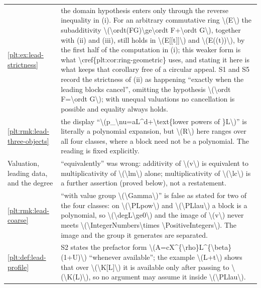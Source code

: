 \documentclass[11pt,oneside]{article}
\theoremstyle{plain}
\theoremstyle{definition}
\theoremstyle{remark}
\begin{document}
\begin{longtable}{@{}p{} p{}@{}}
\cref{plt:ex:lead-strictness} & the domain hypothesis enters only through the reverse inequality in (i). For an arbitrary commutative ring \textbackslash (E\textbackslash ) the subadditivity \textbackslash (\textbackslash ordt(FG)\textbackslash ge\textbackslash ordt F+\textbackslash ordt G\textbackslash ), together with (ii) and (iii), still holds in \textbackslash (E[[t]]\textbackslash ) and \textbackslash (E((t))\textbackslash ), by the first half of the computation in (i); this weaker form is what \textbackslash cref\{plt:cor:ring-geometric\} uses, and stating it here is what keeps that corollary free of a circular appeal. S1 and S5 record the strictness of (ii) as happening ``exactly when the leading blocks cancel'', omitting the hypothesis \textbackslash (\textbackslash ordt F=\textbackslash ordt G\textbackslash ); with unequal valuations no cancellation is possible and equality always holds.\\
\cref{plt:rmk:lead-three-objects} & the display ``\textbackslash (p\_\textbackslash nu=aL\textasciicircum d+\textbackslash text\{lower powers of \}L\textbackslash )'' is literally a polynomial expansion, but \textbackslash (R\textbackslash ) here ranges over all four classes, where a block need not be a polynomial. The reading is fixed explicitly.\\
Valuation, leading data, and the degree  & ``equivalently'' was wrong: additivity of \textbackslash (v\textbackslash ) is equivalent to multiplicativity of \textbackslash (\textbackslash lm\textbackslash ) alone; multiplicativity of \textbackslash (\textbackslash lc\textbackslash ) is a further assertion (proved below), not a restatement.\\
\cref{plt:rmk:lead-coarse} & ``with value group \textbackslash (\textbackslash Gamma\textbackslash )'' is false as stated for two of the four classes: on \textbackslash (\textbackslash PLpow\textbackslash ) and \textbackslash (\textbackslash PLlau\textbackslash ) a block is a polynomial, so \textbackslash (\textbackslash degL\textbackslash ge0\textbackslash ) and the image of \textbackslash (v\textbackslash ) never meets \textbackslash (\textbackslash IntegerNumbers\textbackslash times \textbackslash PositiveIntegers\textbackslash ). The image and the group it generates are separated.\\
\cref{plt:def:lead-profile} & S2 states the prefactor form \textbackslash (A=cX\textasciicircum \{\textbackslash rho\}L\textasciicircum \{\textbackslash beta\}(1+U)\textbackslash ) ``whenever available''; the example \textbackslash (L+t\textbackslash ) shows that over \textbackslash (\textbackslash K[L]\textbackslash ) it is available only after passing to \textbackslash (\textbackslash K(L)\textbackslash ), so no argument may assume it inside \textbackslash (\textbackslash PLlau\textbackslash ).\\

\end{longtable}
\end{document}
